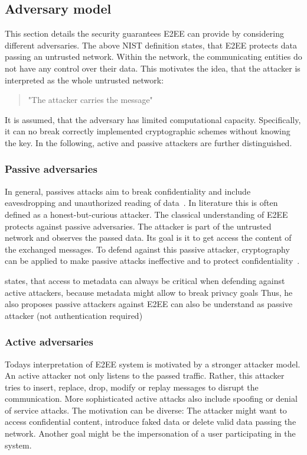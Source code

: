 \documentclass[../main.tex]{subfiles}
\begin{document}
\subsection{Adversary model}
This section details the security guarantees E2EE can provide by considering different adversaries.
The above NIST definition states, that E2EE protects data passing an untrusted network.
Within the network, the communicating entities do not have any control over their data.
This motivates the idea, that the attacker is interpreted as the whole untrusted network:
\begin{quote}
    "The attacker carries the message" 
\end{quote}
It is assumed, that the adversary has limited computational capacity. 
Specifically, it can no break correctly implemented cryptographic schemes without knowing the key.
In the following, active and passive attackers are further distinguished. 

\subsubsection{Passive adversaries}
In general, passives attacks aim to break confidentiality and include eavesdropping and unauthorized reading of data~\cite{Eckert2018}. 
In literature this is often defined as a honest-but-curious attacker. 
The classical understanding of E2EE protects against passive adversaries. 
The attacker is part of the untrusted network and observes the passed data.
Its goal is it to get access the content of the exchanged messages.
To defend against this passive attacker, cryptography can be applied to make passive attacks ineffective and to protect confidentiality~\cite{Eckert2018}.

\cite{Nabeel2017} states, that access to metadata can always be critical when defending against active attackers, because metadata might allow to break privacy goals
Thus, he also proposes passive attackers against E2EE can also be understand as passive attacker (not authentication required)


\subsubsection{Active adversaries}
Todays interpretation of E2EE system is motivated by a stronger attacker model.
An active attacker not only listens to the passed traffic.
Rather, this attacker tries to insert, replace, drop, modify or replay messages to disrupt the communication.
More sophisticated active attacks also include spoofing or denial of service attacks.
The motivation can be diverse: 
The attacker might want to access confidential content, introduce faked data or delete valid data passing the network.
Another goal might be the impersonation of a user participating in the system.~\cite{Eckert2018}
\end{document}
